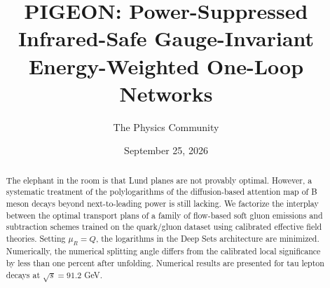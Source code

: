 \documentclass[11pt]{article}
\title{PIGEON: Power-Suppressed Infrared-Safe Gauge-Invariant Energy-Weighted One-Loop Networks}
\author{The Physics Community}
\date{September 25, 2026}
\numberwithin{equation}{section}
\theoremstyle{definition}
\theoremstyle{remark}
\begin{document}
\maketitle
\begin{abstract}
The elephant in the room is that Lund planes are not provably optimal.
However, a systematic treatment of the polylogarithms of the
diffusion-based attention map of B meson decays beyond next-to-leading
power is still lacking. We factorize the interplay between the optimal
transport plans of a family of flow-based soft gluon emissions and
subtraction schemes trained on the quark/gluon dataset using calibrated
effective field theories. Setting $\mu_R = Q$, the logarithms in the
Deep Sets architecture are minimized. Numerically, the numerical
splitting angle differs from the calibrated local significance by less
than one percent after unfolding. Numerical results are presented for
tau lepton decays at $\sqrt{s} = 91.2$ GeV.
\end{abstract}
\tableofcontents




\nocite{*}


\end{document}
